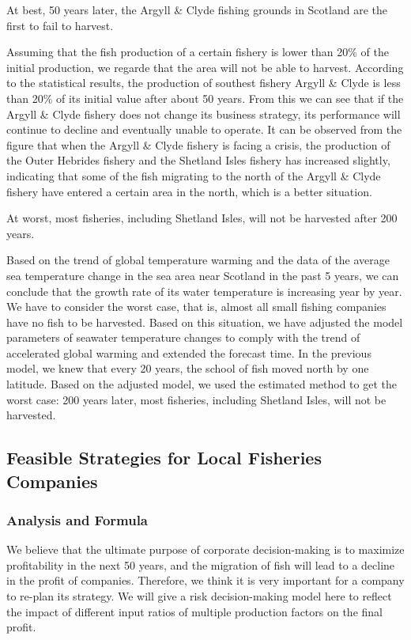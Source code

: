 \documentclass{mcmthesis}
\numberwithin{figure}{section}
\numberwithin{table}{section}
\begin{document}
At best, 50 years later, the Argyll \& Clyde fishing grounds in Scotland are the first to fail to harvest.

Assuming that the fish production of a certain fishery is lower than 20\% of the initial production, we regarde that the area will not be able to harvest. According to the statistical results, the production of southest fishery Argyll \& Clyde is less than 20\% of its initial value after about 50 years. From this we can see that if the Argyll \& Clyde fishery does not change its business strategy, its performance will continue to decline and eventually unable to operate. It can be observed from the figure that when the Argyll \& Clyde fishery is facing a crisis, the production of the Outer Hebrides fishery and the Shetland Isles fishery has increased slightly, indicating that some of the fish migrating to the north of the Argyll \& Clyde fishery have entered a certain area in the north, which is a better situation.

At worst, most fisheries, including Shetland Isles, will not be harvested after 200 years.

Based on the trend of global temperature warming and the data of the average sea temperature change in the sea area near Scotland in the past 5 years, we can conclude that the growth rate of its water temperature is increasing year by year. We have to consider the worst case, that is, almost all small fishing companies have no fish to be harvested. Based on this situation, we have adjusted the model parameters of seawater temperature changes to comply with the trend of accelerated global warming and extended the forecast time. In the previous model, we knew that every 20 years, the school of fish moved north by one latitude. Based on the adjusted model, we used the estimated method to get the worst case: 200 years later, most fisheries, including Shetland Isles, will not be harvested.

\subsection{Feasible Strategies for Local Fisheries Companies}

\subsubsection{Analysis and Formula}
We believe that the ultimate purpose of corporate decision-making is to maximize profitability in the next 50 years, and the migration of fish will lead to a decline in the profit of companies. Therefore, we think it is very important for a company to re-plan its strategy. We will give a risk decision-making model here to reflect the impact of different input ratios of multiple production factors on the final profit.
\end{document}
